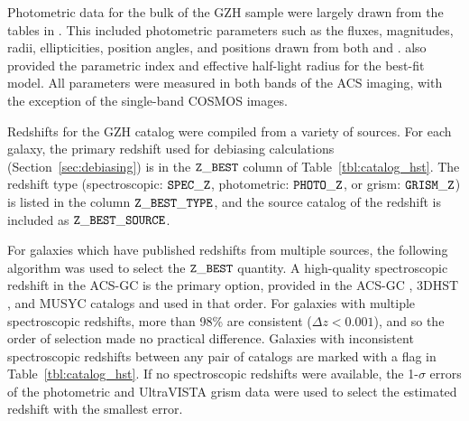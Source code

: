 \documentclass[twocolumn]{aastex6}
\begin{document}
Photometric data for the bulk of the GZH sample were largely drawn from the
tables in \citet{gri12}. This included photometric parameters such as
the fluxes, magnitudes, radii, ellipticities, position angles, and positions
drawn from both \sextractor{} and \galfit. \galfit{} also provided the
parametric \sersic{} index and effective half-light radius for the best-fit
model. All parameters were measured in both bands of the ACS imaging, with the
exception of the single-band COSMOS images.

Redshifts for the GZH catalog were compiled from a variety of sources. For each
galaxy, the primary redshift used for debiasing calculations
(Section~\ref{sec:debiasing}) is in the $\tt Z\_BEST$ column of
Table~\ref{tbl:catalog_hst}. The redshift type (spectroscopic: $\tt SPEC\_Z$,
photometric: $\tt PHOTO\_Z$, or grism: $ \tt GRISM\_Z$) is listed in the column
$\tt Z\_BEST\_TYPE$, and the source catalog of the redshift is included as $\tt
Z\_BEST\_SOURCE$. 

For galaxies which have published redshifts from multiple sources, the
following algorithm was used to select the $\tt Z\_BEST$ quantity. A
high-quality spectroscopic redshift in the ACS-GC is the primary option,
provided in the ACS-GC \citep{gri12}, 3DHST \citep{mom15}, and MUSYC
\citep{car10} catalogs and used in that order. For galaxies with multiple
spectroscopic redshifts, more than 98\% are consistent ($\Delta z<0.001$), and
so the order of selection made no practical difference. Galaxies with
inconsistent spectroscopic redshifts between any pair of catalogs are marked
with a flag in Table~\ref{tbl:catalog_hst}. If no spectroscopic redshifts were
available, the 1-$\sigma$ errors of the photometric \citep[ACS-GC, 3DHST,
MUSYC, UltraVISTA;][]{ilb13} and UltraVISTA grism data were used to select the
estimated redshift with the smallest error. 
 
\end{document}
